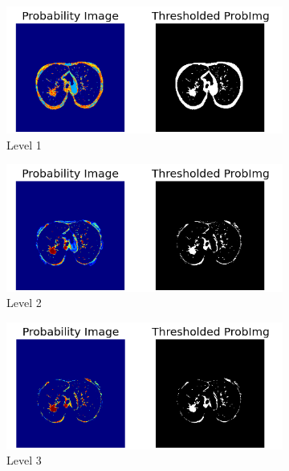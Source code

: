\begin{figure}[p]
\begin{center}
	\begin{subfigure}[b]{\linewidth}
		\includegraphics[width=\linewidth]{img/cascades/D50S95L1.png}
		\caption{Level 1}
	\end{subfigure}
	\begin{subfigure}[b]{\linewidth}
		\includegraphics[width=\linewidth]{img/cascades/D50S95L2.png}
		\caption{Level 2}
	\end{subfigure}
	\begin{subfigure}[b]{\linewidth}
		\includegraphics[width=\linewidth]{img/cascades/D50S95L3.png}
		\caption{Level 3}
	\end{subfigure}
	\begin{subfigure}[b]{\linewidth}

\end{subfigure}
\end{center}
\end{figure}
